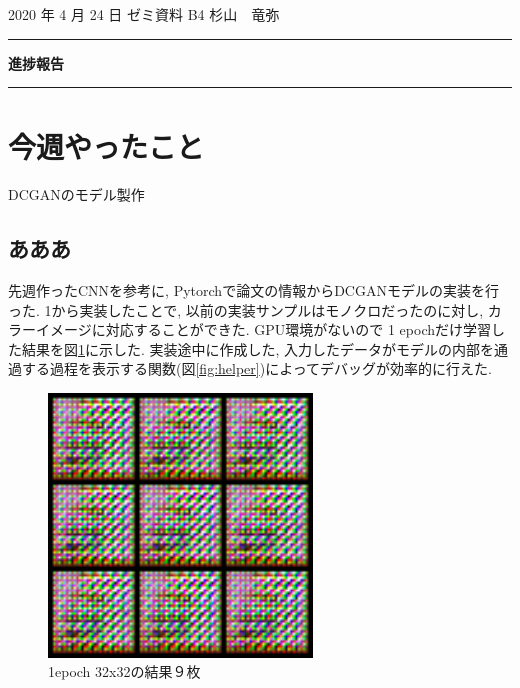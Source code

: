 \documentclass[onecolumn]{ujarticle}   %
\begin{document}
	\noindent

	\hspace{1em}
	2020 年 4 月 24 日
	ゼミ資料
	\hfill
	B4 杉山　竜弥

	\vspace{2mm}

	\hrule

	\begin{center}
		{\Large \bf 進捗報告}
	\end{center}


	\hrule
	\vspace{3mm}

	\section{今週やったこと}
	\begin{itemize}{
		\item{DCGANのモデル製作}
	}\end{itemize}
	\subsection{あああ}
	先週作ったCNNを参考に, Pytorchで論文の情報からDCGANモデルの実装を行った. 1から実装したことで, 以前の実装サンプルはモノクロだったのに対し, カラーイメージに対応することができた. GPU環境がないので 1 epochだけ学習した結果を図\ref{fig:result}に示した. 実装途中に作成した, 入力したデータがモデルの内部を通過する過程を表示する関数(図\ref{fig:helper})によってデバッグが効率的に行えた.

	\begin{figure}[htbp]
  	\begin{center}
	    \includegraphics[clip,width=7.0cm]{../../test/images/3100.png}
	    \caption{1epoch 32x32の結果９枚}
	    \label{fig:result}
	  \end{center}
	\end{figure}
\end{document}
